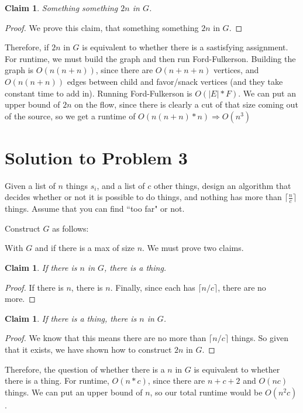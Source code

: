 \documentclass[11pt]{article}
\newtheorem{claim}[theorem]{Claim}
\begin{document}
\begin{claim} 
Something something $2n$ in $G$. 
\end{claim}
\begin{proof}
We prove this claim, that something something $2n$ in $G$.
\end{proof}
Therefore, if $2n$ in $G$ is equivalent to whether there is a sastisfying assignment. For runtime, we must build the graph and then run Ford-Fulkerson. Building the graph is $O(n(n+n))$, since there are $O(n+n+n)$ vertices, and $O(n(n+n))$ edges between child and favor/snack vertices (and they take constant time to add in). Running Ford-Fulkerson is $O(|E|*F)$. We can put an upper bound of $2n$ on the flow, since there is clearly a cut of that size coming out of the source, so we get a runtime of $O(n(n+n) * n) \Rightarrow O(n^{3})$

\newpage

\section*{Solution to Problem 3}



Given a list of $n$ things $s_i$, and a list of $c$ other things, design an algorithm that decides whether or not it is possible to do things, and nothing has more than $\lceil \frac{n}{c} \rceil$ things. Assume that you can find ``too far" or not.

Construct $G$ as follows:


With $G$ and if there is a max of size $n$. We must prove two claims.
\begin{claim} 
If there is $n$ in $G$, there is a thing. 
\end{claim}
\begin{proof}
If there is $n$, there is $n$. Finally, since each has $\lceil n/c \rceil$, there are no more.
\end{proof}


\begin{claim} 
If there is a thing, there is $n$ in $G$. 
\end{claim}
\begin{proof}
We know that this means there are no more than $\lceil n/c \rceil$ things. So given that it exists, we have shown how to construct $2n$ in $G$.
\end{proof}
Therefore, the question of whether there is a $n$ in $G$ is equivalent to whether there is a thing. For runtime, $O(n*c)$, since there are $n+c+2$ and $O(nc)$ things. We can put an upper bound of $n$, so our total runtime would be $O(n^{2}c)$.
\end{document}
